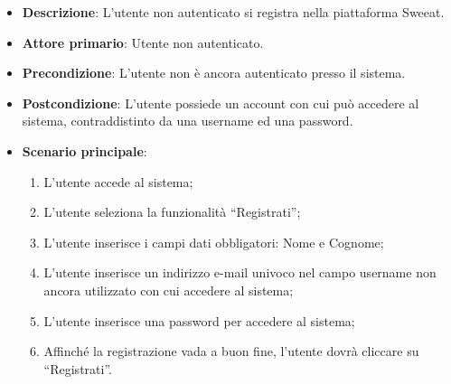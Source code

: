\begin{itemize}
\item \textbf{Descrizione}: L'utente non autenticato si registra nella piattaforma Sweeat.
\item \textbf{Attore primario}: Utente non autenticato.
\item \textbf{Precondizione}: L'utente non è ancora autenticato presso il sistema.
\item \textbf{Postcondizione}: L’utente possiede un account con cui può accedere al sistema, contraddistinto da una username ed una password.

\item \textbf{Scenario principale}:
\begin{enumerate}
\item L’utente accede al sistema;
\item L’utente seleziona la funzionalità “Registrati”;
\item L'utente inserisce i campi dati obbligatori: Nome e Cognome;
\item L’utente inserisce un indirizzo e-mail univoco nel campo username non ancora utilizzato con cui accedere al sistema; 
\item L’utente inserisce una password per accedere al sistema;
\item Affinché la registrazione vada a buon fine, l’utente dovrà cliccare su “Registrati”.
\end{enumerate}


\end{itemize}
